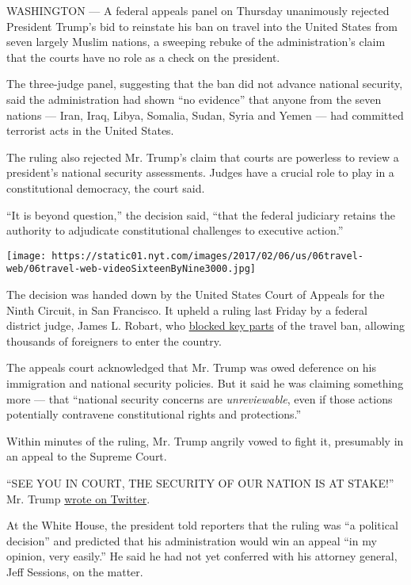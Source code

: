WASHINGTON --- A federal appeals panel on Thursday unanimously rejected
President Trump's bid to reinstate his ban on travel into the United
States from seven largely Muslim nations, a sweeping rebuke of the
administration's claim that the courts have no role as a check on the
president.

The three-judge panel, suggesting that the ban did not advance national
security, said the administration had shown ``no evidence'' that anyone
from the seven nations --- Iran, Iraq, Libya, Somalia, Sudan, Syria and
Yemen --- had committed terrorist acts in the United States.

The ruling also rejected Mr. Trump's claim that courts are powerless to
review a president's national security assessments. Judges have a
crucial role to play in a constitutional democracy, the court said.

``It is beyond question,'' the decision said, ``that the federal
judiciary retains the authority to adjudicate constitutional challenges
to executive action.''

\texttt{[image: https://static01.nyt.com/images/2017/02/06/us/06travel-web/06travel-web-videoSixteenByNine3000.jpg]}

The decision was handed down by the United States Court of Appeals for
the Ninth Circuit, in San Francisco. It upheld a ruling last Friday by a
federal district judge, James L. Robart, who
\href{http://cdn.ca9.uscourts.gov/datastore/general/2017/02/03/17-141_TRO_order.pdf}{blocked
key parts} of the travel ban, allowing thousands of foreigners to enter
the country.

The appeals court acknowledged that Mr. Trump was owed deference on his
immigration and national security policies. But it said he was claiming
something more --- that ``national security concerns are
\emph{unreviewable}, even if those actions potentially contravene
constitutional rights and protections.''

Within minutes of the ruling, Mr. Trump angrily vowed to fight it,
presumably in an appeal to the Supreme Court.

``SEE YOU IN COURT, THE SECURITY OF OUR NATION IS AT STAKE!'' Mr. Trump
\href{https://twitter.com/realDonaldTrump/status/829836231802515457}{wrote
on Twitter}.

At the White House, the president told reporters that the ruling was ``a
political decision'' and predicted that his administration would win an
appeal ``in my opinion, very easily.'' He said he had not yet conferred
with his attorney general, Jeff Sessions, on the matter.

